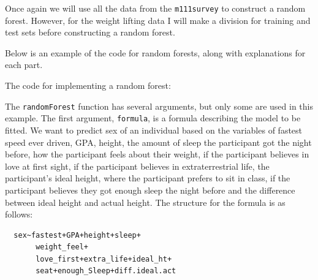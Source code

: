 \documentclass[12pt,twoside]{reedthesis}
\begin{document}
  Once again we will use all the data from the \texttt{m111survey} to
  construct a random forest. However, for the weight lifting data I will
  make a division for training and test sets before constructing a random
  forest.
  
  Below is an example of the code for random forests, along with
  explanations for each part.
  
  The code for implementing a random forest:
  
  \begin{Shaded}
  \begin{Highlighting}[]
  \NormalTok{(}\NormalTok{)}
  
  \StringTok{ }
  \StringTok{                             }
  \StringTok{                             }
  \StringTok{                             }
                               \NormalTok{)}
  \end{Highlighting}
  \end{Shaded}
  
  The \texttt{randomForest} function has several arguments, but only some
  are used in this example. The first argument, \texttt{formula}, is a
  formula describing the model to be fitted. We want to predict sex of an
  individual based on the variables of fastest speed ever driven, GPA,
  height, the amount of sleep the participant got the night before, how
  the participant feels about their weight, if the participant believes in
  love at first sight, if the participant believes in extraterrestrial
  life, the participant's ideal height, where the participant prefers to
  sit in class, if the participant believes they got enough sleep the
  night before and the difference between ideal height and actual height.
  The structure for the formula is as follows:
  
  \begin{verbatim}
  sex~fastest+GPA+height+sleep+
       weight_feel+
       love_first+extra_life+ideal_ht+
       seat+enough_Sleep+diff.ideal.act
       
  \end{verbatim}
  
\end{document}
